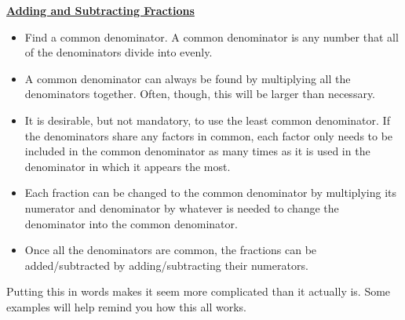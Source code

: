 \begin{definition}
	\textbf{\underline{Adding and Subtracting Fractions}}\\
	\bigskip
	\begin{itemize}[leftmargin=*]
		\item Find a common denominator.  A common denominator is any number that all of the denominators divide into evenly.
		\item A common denominator can always be found by multiplying all the denominators together.  Often, though, this will be larger than necessary.
		\item It is desirable, but not mandatory, to use the least common denominator. If the denominators share any factors in common, each factor only needs to be included in the	common denominator as many times as it is used in the denominator in which it appears the most.
		\item Each fraction can be changed to the common denominator by multiplying its numerator and denominator by whatever is needed to change the denominator into the common	denominator.
		\item Once all the denominators are common, the fractions can be added/subtracted by adding/subtracting their numerators.
	\end{itemize}
\end{definition}

Putting this in words makes it seem more complicated than it actually is. Some examples will help remind you how this all works.




